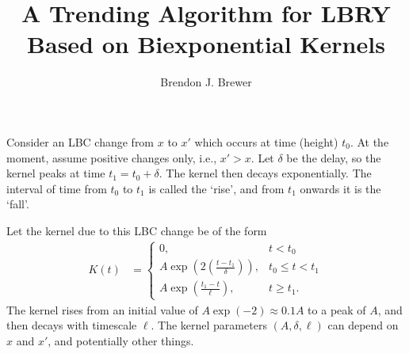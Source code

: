 \documentclass[a4paper, 12pt]{article}
\title{A Trending Algorithm for LBRY Based on Biexponential Kernels}
\author{Brendon J. Brewer}
\date{}
\begin{document}
\maketitle


\setlength{\parindent}{0pt}
\setlength{\parskip}{8pt}

Consider an LBC change from $x$ to $x'$ which occurs at time (height) $t_0$.
At the moment, assume positive changes only, i.e., $x' > x$.
Let $\delta$ be the delay, so the kernel peaks at time $t_1 = t_0 + \delta$.
The kernel then decays exponentially. The interval
of time from $t_0$ to $t_1$ is called the `rise', and from $t_1$ onwards it is
the `fall'.

Let the kernel due to this LBC change be of the form
\begin{align}
K(t) &=
    \left\{
        \begin{array}{lr}
            0, & t < t_0 \\
            A\exp\left(2\left(\frac{t - t_1}{\delta}\right)\right),
                                                & t_0 \leq t < t_1 \\
            A\exp\left(\frac{t_1 - t}{\ell}  \right),  & t \geq t_1.
        \end{array}
    \right.
\end{align}
The kernel rises from an initial value of $A\exp(-2) \approx 0.1A$ to a peak
of $A$, and then decays with timescale $\ell$. The kernel parameters
$(A, \delta, \ell)$ can depend on $x$ and $x'$, and potentially other things.

\end{document}
